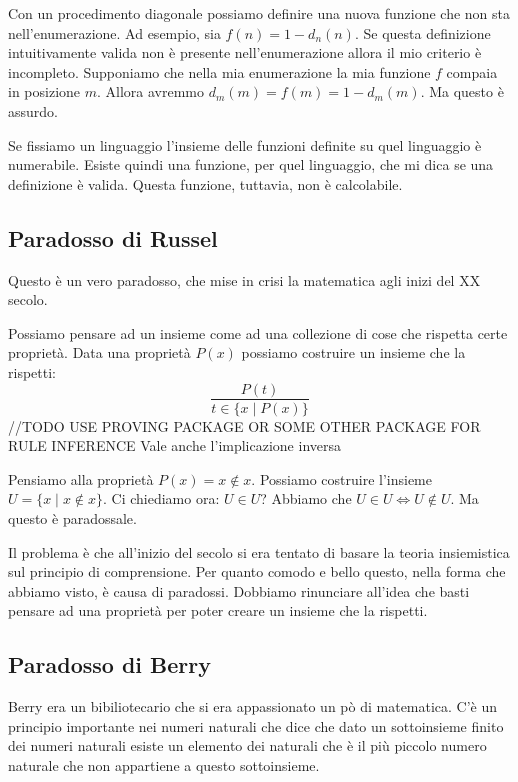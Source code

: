 Con un procedimento diagonale possiamo definire una nuova funzione che non sta nell'enumerazione. Ad
esempio, sia $f(n) = 1 - d_{n}(n)$. Se questa definizione intuitivamente valida non è presente
nell'enumerazione allora il mio criterio è incompleto.  Supponiamo che nella mia enumerazione la
mia funzione $f$ compaia in posizione $m$. Allora avremmo $d_m(m) = f(m) = 1 - d_m(m)$. Ma questo è
assurdo.

Se fissiamo un linguaggio l'insieme delle funzioni definite su quel linguaggio è numerabile. Esiste
quindi una funzione, per quel linguaggio, che mi dica se una definizione è valida. Questa funzione,
tuttavia, non è calcolabile.

\subsection{Paradosso di Russel}

Questo è un vero paradosso, che mise in crisi la matematica agli inizi del XX secolo.

Possiamo pensare ad un insieme come ad una collezione di cose che rispetta certe proprietà. Data
una proprietà $P(x)$ possiamo costruire un insieme che la rispetti:
\begin{equation*}
    \frac{P(t)}{t \in \{x \mid P(x)\}} %
\end{equation*}
//TODO USE PROVING PACKAGE OR SOME OTHER PACKAGE FOR RULE INFERENCE
Vale anche l'implicazione inversa

Pensiamo alla proprietà $P(x) = x \notin x$. Possiamo costruire l'insieme $U = \{x \mid x \notin x\}$. Ci
chiediamo ora: $U \in U$? Abbiamo che $U \in U \iff U \notin U$. Ma questo è paradossale.

Il problema è che all'inizio del secolo si era tentato di basare la teoria insiemistica sul
principio di comprensione. Per quanto comodo e bello questo, nella forma che abbiamo visto, è causa
di paradossi. Dobbiamo rinunciare all'idea che basti pensare ad una proprietà per poter creare un
insieme che la rispetti.

\subsection{Paradosso di Berry}

Berry era un bibiliotecario che si era appassionato un pò di matematica. C'è un principio
importante nei numeri naturali che dice che dato un sottoinsieme finito dei numeri naturali esiste un
elemento dei naturali che è il più piccolo numero naturale che non appartiene a questo sottoinsieme.

